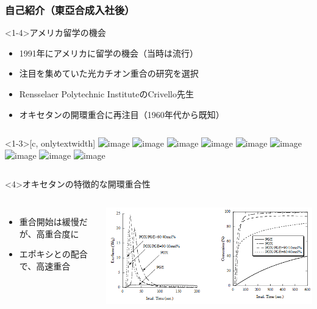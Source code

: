 \documentclass[unicode,12pt]{beamer}%
\begin{document}
\begin{frame}
	\frametitle{自己紹介（東亞合成入社後）}
        \begin{block}<1-4>{アメリカ留学の機会}
            \begin{itemize}
                \item 1991年にアメリカに留学の機会（当時は流行）
                \item 注目を集めていた光カチオン重合の研究を選択
                \item Rensselaer Polytechnic InstituteのCrivello先生
                \item<3-> オキセタンの開環重合に再注目（1960年代から既知）
            \end{itemize}
        \end{block}
        \begin{columns}<1-3>[c, onlytextwidth]
            \centering
            \includegraphics<1>[width=.5\textwidth]{US_map.png}
            \includegraphics<1>[width=.5\textwidth]{USA_New_York_location_map.svg.png}
            \includegraphics<2>[width=.8\textwidth]{Cat_PI_init.png}
            \includegraphics<3>[width=.7\textwidth]{Cat_ROP_2.png}
            \centering
            \includegraphics<1>[width=.7\textwidth]{RPI.png}
            \includegraphics<1>[width=.7\textwidth]{rpi2.jpg}
            \includegraphics<1>[width=.5\textwidth]{RPI_logo.png}
            \includegraphics<2>[width=.7\textwidth]{Cat_ROP.png}
            \includegraphics<3>[width=.7\textwidth]{Cat_ROP_3.png}
        \end{columns}

        \begin{alertblock}<4>{オキセタンの特徴的な開環重合性}
            \begin{columns}[c, onlytextwidth]
                \begin{itemize}
                    \item 重合開始は緩慢だが、高重合度に
                    \item エポキシとの配合で、高速重合
                \end{itemize}
                \centering
                \includegraphics[width=\textwidth]{Photo-DSC_res.png}
            \end{columns}
        \end{alertblock}
\end{frame}
\end{document}
